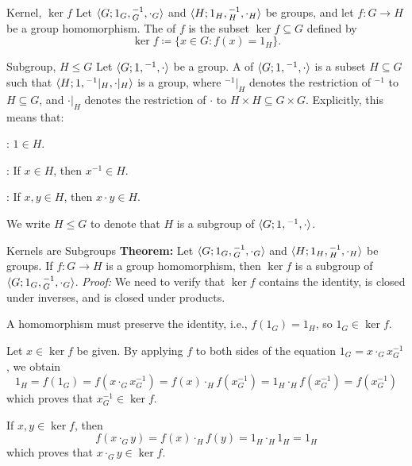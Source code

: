 \documentclass[12pt]{report}
\begin{document}
\begin{dfnbox}{Kernel, $\ker f$}
	Let ${\langle {G; 1_G, {}^{-1}_G, \cdot_G} \rangle}$ and ${\langle {H; 1_H, {}^{-1}_H, \cdot_H} \rangle}$ be groups, and let $f: G \to H$ be a group homomorphism. The  of $f$ is the subset $\ker f \subseteq G$ defined by
	\[ \ker f \coloneq \{ x \in G : f(x) = 1_H \}. \]
\end{dfnbox}

\begin{dfnbox}{Subgroup, $H \le G$}
	Let ${\langle {G; 1, {}^{-1}, \cdot} \rangle}$ be a group. A  of ${\langle {G; 1, {}^{-1}, \cdot} \rangle}$ is a subset $H \subseteq G$ such that ${\langle {H; 1, {}^{-1}|_H, \cdot|_H} \rangle}$ is a group, where ${}^{-1}|_H$ denotes the restriction of ${}^{-1}$ to $H \subseteq G$, and $\cdot|_H$ denotes the restriction of $\cdot$ to $H \times H \subseteq G \times G$. Explicitly, this means that:
	\begin{dfnitems}
		\item {}: $1 \in H$.
		\item {}: If $x \in H$, then $x^{-1} \in H$.
		\item {}: If $x, y \in H$, then $x \cdot y \in H$.
	\end{dfnitems}
	We write $H \le G$ to denote that $H$ is a subgroup of ${\langle {G; 1, {}^{-1}, \cdot} \rangle}$.
\end{dfnbox}

\begin{thmbox}{Kernels are Subgroups}
	\textbf{Theorem:} Let ${\langle {G; 1_G, {}^{-1}_G, \cdot_G} \rangle}$ and ${\langle {H; 1_H, {}^{-1}_H, \cdot_H} \rangle}$ be groups. If $f: G \to H$ is a group homomorphism, then $\ker f$ is a subgroup of ${\langle {G; 1_G, {}^{-1}_G, \cdot_G} \rangle}$.
\tcblower
	\textit{Proof:} We need to verify that $\ker f$ contains the identity, is closed under inverses, and is closed under products.
	\begin{dfnitems}
		\item A homomorphism must preserve the identity, i.e., $f(1_G) = 1_H$, so $1_G \in \ker f$.
		\item Let $x \in \ker f$ be given. By applying $f$ to both sides of the equation $1_G = x \cdot_G x^{-1}_G$, we obtain
		\[ 1_H = f(1_G) = f(x \cdot_G x^{-1}_G) = f(x) \cdot_H f(x^{-1}_G) = 1_H \cdot_H f(x^{-1}_G) = f(x^{-1}_G) \]
		which proves that $x^{-1}_G \in \ker f$.
		\item If $x, y \in \ker f$, then
		\[ f(x \cdot_G y) = f(x) \cdot_H f(y) = 1_H \cdot_H 1_H = 1_H \]
		which proves that $x \cdot_G y \in \ker f$.
	\end{dfnitems}
\end{thmbox}
\end{document}
